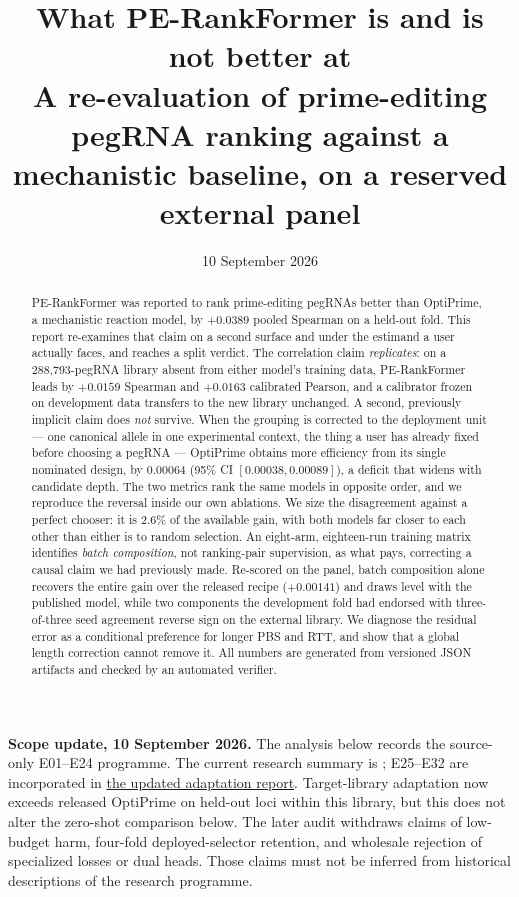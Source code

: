 \documentclass[11pt]{article}
\title{\textbf{What PE-RankFormer is and is not better at}\\[0.35em]
\large A re-evaluation of prime-editing pegRNA ranking against a\\
mechanistic baseline, on a reserved external panel}
\author{}
\date{10 September 2026}
\begin{document}
\maketitle

\noindent\textbf{Scope update, 10 September 2026.} The analysis below records the
source-only E01--E24 programme. The current research summary is
; E25--E32 are incorporated in
\href{adaptation_report.pdf}{the updated adaptation report}.
Target-library adaptation now exceeds released OptiPrime on held-out loci within
this library, but this does not alter the zero-shot comparison below. The later
audit withdraws claims of low-budget harm, four-fold deployed-selector retention,
and wholesale rejection of specialized losses or dual heads. Those claims must
not be inferred from historical descriptions of the research programme.
\medskip

\begin{abstract}
\noindent
PE-RankFormer was reported to rank prime-editing pegRNAs better than OptiPrime, a
mechanistic reaction model, by $+0.0389$ pooled Spearman on a held-out fold. This report
re-examines that claim on a second surface and under the estimand a user actually faces, and
reaches a split verdict. The correlation claim \emph{replicates}: on a 288{,}793-pegRNA
library absent from either model's training data, PE-RankFormer leads by $+0.0159$ Spearman
and $+0.0163$ calibrated Pearson, and a calibrator frozen on development data transfers to
the new library unchanged. A second, previously implicit claim does \emph{not} survive. When
the grouping is corrected to the deployment unit --- one canonical allele in one experimental
context, the thing a user has already fixed before choosing a pegRNA --- OptiPrime obtains
more efficiency from its single nominated design, by $0.00064$
(95\% CI $[0.00038, 0.00089]$), a deficit that widens with candidate depth. The two metrics
rank the same models in opposite order, and we reproduce the reversal inside our own
ablations. We size the disagreement against a perfect chooser: it is 2.6\% of the available
gain, with both models far closer to each other than either is to random selection. An
eight-arm, eighteen-run training matrix identifies \emph{batch composition}, not ranking-pair
supervision, as what pays, correcting a causal claim we had previously made. Re-scored on the
panel, batch composition alone recovers the entire gain over the released recipe
($+0.00141$) and draws level with the published model, while two components the development
fold had endorsed with three-of-three seed agreement reverse sign on the external
library. We diagnose the residual error as a conditional
preference for longer PBS and RTT, and show that a global length correction cannot remove it.
All numbers are generated from versioned JSON artifacts and checked by an automated
verifier.
\end{abstract}
\end{document}
